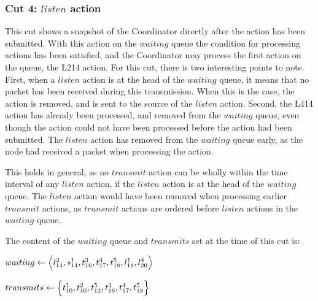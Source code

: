\subsubsection{Cut 4: $listen$ action}
This cut shows a snapshot of the Coordinator directly after the  action has been submitted. With this action on the $waiting$ queue the condition for processing actions has been satisfied, and the Coordinator may process the first action on the queue, the \L{2}{14} action. For this cut, there is two interesting points to note. First, when a $listen$ action is at the head of the $waiting$ queue, it means that no packet has been received during this transmission. When this is the case, the action is removed, and \KwNull is sent to the source of the $listen$ action. Second, the \L{4}{14} action has already been processed, and removed from the $waiting$ queue, even though the action could not have been processed before the  action had been submitted. The $listen$ action has removed from the $waiting$ queue early, as the node had received a packet when processing the  action.  \medbreak

This holds in general, as no $transmit$ action can be wholly within the time interval of any $listen$ action, if the $listen$ action is at the head of the $waiting$ queue. The $listen$ action would have been removed when processing earlier $transmit$ actions, as $transmit$ actions are ordered before $listen$ actions in the $waiting$ queue. \medbreak


The content of the $waiting$ queue and $transmits$ set at the time of this cut is: \smallbreak

$waiting \leftarrow \Big\langle%
    \L{2}{14}, %
    \S{1}{14}, %
    \T{3}{16}, %
    \T{4}{17}, %
    \T{5}{18}, %
    \L{1}{18}, %
    \L{4}{20} %
    \Big\rangle$

$transmits \leftarrow \Big\{ t^{1}_{10}, t^{2}_{10}, t^{5}_{12}, t^{3}_{16}, t^{4}_{17}, t^{5}_{18} \Big\}$ \smallbreak


